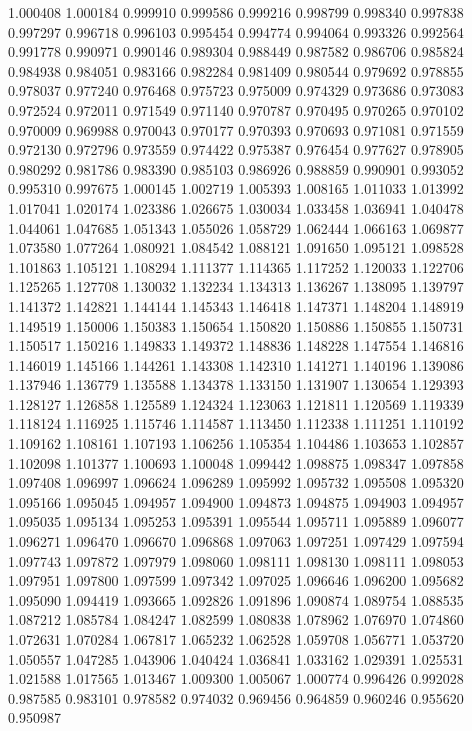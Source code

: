 1.000408
1.000184
0.999910
0.999586
0.999216
0.998799
0.998340
0.997838
0.997297
0.996718
0.996103
0.995454
0.994774
0.994064
0.993326
0.992564
0.991778
0.990971
0.990146
0.989304
0.988449
0.987582
0.986706
0.985824
0.984938
0.984051
0.983166
0.982284
0.981409
0.980544
0.979692
0.978855
0.978037
0.977240
0.976468
0.975723
0.975009
0.974329
0.973686
0.973083
0.972524
0.972011
0.971549
0.971140
0.970787
0.970495
0.970265
0.970102
0.970009
0.969988
0.970043
0.970177
0.970393
0.970693
0.971081
0.971559
0.972130
0.972796
0.973559
0.974422
0.975387
0.976454
0.977627
0.978905
0.980292
0.981786
0.983390
0.985103
0.986926
0.988859
0.990901
0.993052
0.995310
0.997675
1.000145
1.002719
1.005393
1.008165
1.011033
1.013992
1.017041
1.020174
1.023386
1.026675
1.030034
1.033458
1.036941
1.040478
1.044061
1.047685
1.051343
1.055026
1.058729
1.062444
1.066163
1.069877
1.073580
1.077264
1.080921
1.084542
1.088121
1.091650
1.095121
1.098528
1.101863
1.105121
1.108294
1.111377
1.114365
1.117252
1.120033
1.122706
1.125265
1.127708
1.130032
1.132234
1.134313
1.136267
1.138095
1.139797
1.141372
1.142821
1.144144
1.145343
1.146418
1.147371
1.148204
1.148919
1.149519
1.150006
1.150383
1.150654
1.150820
1.150886
1.150855
1.150731
1.150517
1.150216
1.149833
1.149372
1.148836
1.148228
1.147554
1.146816
1.146019
1.145166
1.144261
1.143308
1.142310
1.141271
1.140196
1.139086
1.137946
1.136779
1.135588
1.134378
1.133150
1.131907
1.130654
1.129393
1.128127
1.126858
1.125589
1.124324
1.123063
1.121811
1.120569
1.119339
1.118124
1.116925
1.115746
1.114587
1.113450
1.112338
1.111251
1.110192
1.109162
1.108161
1.107193
1.106256
1.105354
1.104486
1.103653
1.102857
1.102098
1.101377
1.100693
1.100048
1.099442
1.098875
1.098347
1.097858
1.097408
1.096997
1.096624
1.096289
1.095992
1.095732
1.095508
1.095320
1.095166
1.095045
1.094957
1.094900
1.094873
1.094875
1.094903
1.094957
1.095035
1.095134
1.095253
1.095391
1.095544
1.095711
1.095889
1.096077
1.096271
1.096470
1.096670
1.096868
1.097063
1.097251
1.097429
1.097594
1.097743
1.097872
1.097979
1.098060
1.098111
1.098130
1.098111
1.098053
1.097951
1.097800
1.097599
1.097342
1.097025
1.096646
1.096200
1.095682
1.095090
1.094419
1.093665
1.092826
1.091896
1.090874
1.089754
1.088535
1.087212
1.085784
1.084247
1.082599
1.080838
1.078962
1.076970
1.074860
1.072631
1.070284
1.067817
1.065232
1.062528
1.059708
1.056771
1.053720
1.050557
1.047285
1.043906
1.040424
1.036841
1.033162
1.029391
1.025531
1.021588
1.017565
1.013467
1.009300
1.005067
1.000774
0.996426
0.992028
0.987585
0.983101
0.978582
0.974032
0.969456
0.964859
0.960246
0.955620
0.950987

